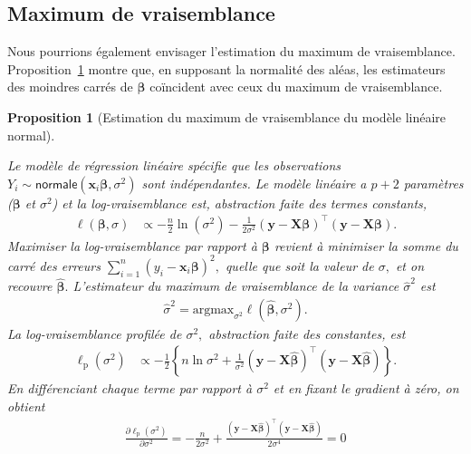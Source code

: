 \documentclass[
  11pt,
  letterpaper,
]{scrbook}
\theoremstyle{plain}
\newtheorem{proposition}{Proposition}[chapter]
\theoremstyle{plain}
\theoremstyle{definition}
\theoremstyle{definition}
\theoremstyle{remark}
\begin{document}
\subsection{Maximum de vraisemblance}\label{maximum-de-vraisemblance}

Nous pourrions également envisager l'estimation du maximum de
vraisemblance. Proposition~\ref{prp-mle-normal-linmod} montre que, en
supposant la normalité des aléas, les estimateurs des moindres carrés de
\(\boldsymbol{\beta}\) coïncident avec ceux du maximum de vraisemblance.

\begin{proposition}[Estimation du maximum de vraisemblance du modèle
linéaire
normal]\protect\hypertarget{prp-mle-normal-linmod}{}\label{prp-mle-normal-linmod}

Le modèle de régression linéaire spécifie que les observations
\(Y_i \sim \mathsf{normale}(\mathbf{x}_i\boldsymbol{\beta}, \sigma^2)\)
sont indépendantes. Le modèle linéaire a \(p+2\) paramètres
(\(\boldsymbol{\beta}\) et \(\sigma^2\)) et la log-vraisemblance est,
abstraction faite des termes constants, \begin{align*}
\ell(\boldsymbol{\beta}, \sigma)&\propto-\frac{n}{2} \ln (\sigma^2) -\frac{1}{2\sigma^2}(\boldsymbol{y}-\mathbf{X}\boldsymbol{\beta})^\top(\boldsymbol{y}-\mathbf{X}\boldsymbol{\beta}).
\end{align*} Maximiser la log-vraisemblance par rapport à
\(\boldsymbol{\beta}\) revient à minimiser la somme du carré des erreurs
\(\sum_{i=1}^n (y_i - \mathbf{x}_i\boldsymbol{\beta})^2,\) quelle que
soit la valeur de \(\sigma,\) et on recouvre
\(\widehat{\boldsymbol{\beta}}.\) L'estimateur du maximum de
vraisemblance de la variance \(\widehat{\sigma}^2\) est \begin{align*}
\widehat{\sigma}^2=\mathrm{arg max}_{\sigma^2} \ell(\widehat{\boldsymbol{\beta}}, \sigma^2).
\end{align*} La log-vraisemblance profilée de \(\sigma^2,\) abstraction
faite des constantes, est \begin{align*}
\ell_{\mathrm{p}}(\sigma^2)
&\propto-\frac{1}{2}\left\{n\ln\sigma^2+\frac{1}{\sigma^2}(\boldsymbol{y}-\mathbf{X}\hat{\boldsymbol{\beta}})^\top(\boldsymbol{y}-\mathbf{X}\hat{\boldsymbol{\beta}})\right\}.
\end{align*} En différenciant chaque terme par rapport à \(\sigma^2\) et
en fixant le gradient à zéro, on obtient \begin{align*}
\frac{\partial \ell_{\mathrm{p}}(\sigma^2)}{\partial \sigma^2} = -\frac{n}{2\sigma^2} + \frac{(\boldsymbol{y}-\mathbf{X}\hat{\boldsymbol{\beta}})^\top(\boldsymbol{y}-\mathbf{X}\hat{\boldsymbol{\beta}})}{2\sigma^4} = 0
\end{align*}


\end{proposition}
\end{document}
